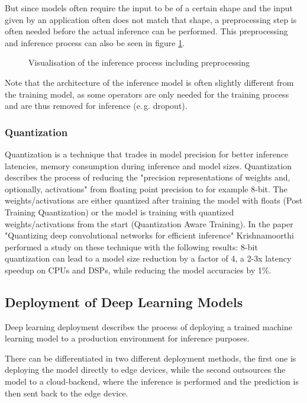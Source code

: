 But since models often require the input to be of a certain shape and the input given by an application often does not match that shape, a preprocessing step is often needed before the actual inference can be performed.
This preprocessing and inference process can also be seen in figure \ref{fig:InfProcess}.
\begin{figure}[H]
\centering

\caption{Visualisation of the inference process including preprocessing}
\label{fig:InfProcess}
\end{figure}
Note that the architecture of the inference model is often slightly different from the training model, as some operators are only needed for the training process and are thus removed for inference (e.\,g. dropout).






\subsubsection{Quantization}
\label{chap:quant}
Quantization is a technique that trades in model precision for better inference latencies, memory consumption during inference and model sizes.
Quantization describes the process of reducing the "precision representations of weights and, optionally, activations" \cite{tfLiteQuant} from floating point precision to for example 8-bit.
The weights/activations are either quantized after training the model with floats (Post Training Quantization) or the model is training with quantized weights/activations from the start (Quantization Aware Training). In the paper "Quantizing deep convolutional networks for
efficient inference"\cite{Quantizing} Krishnamoorthi performed a study on these technique with the following results:
8-bit quantization can lead to a model size reduction by a factor of 4, a 2-3x latency speedup on CPUs and DSPs, while reducing the model accuracies by 1\%.


\subsection{Deployment of Deep Learning Models}
Deep learning deployment describes the process of deploying a trained machine learning model to a production environment for inference purposes. 

There can be differentiated in two different deployment methods, the first one is deploying the model directly to edge devices, while the second outsources the model to a cloud-backend, where the inference is performed and the prediction is then sent back to the edge device.
